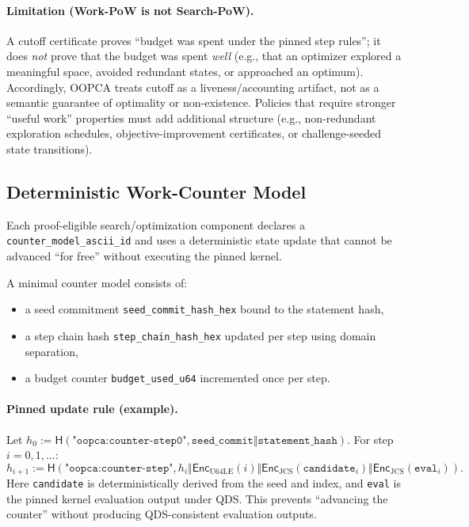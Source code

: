 \documentclass[11pt]{article}
\newcommand{\Hash}{\mathsf{H}}
\newcommand{\Enc}{\mathsf{Enc}}
\begin{document}
\paragraph{Limitation (Work-PoW is not Search-PoW).}
A cutoff certificate proves ``budget was spent under the pinned step rules''; it does \emph{not} prove that the budget was spent \emph{well} (e.g., that an optimizer explored a meaningful space, avoided redundant states, or approached an optimum).
Accordingly, OOPCA treats cutoff as a liveness/accounting artifact, not as a semantic guarantee of optimality or non-existence.
Policies that require stronger ``useful work'' properties must add additional structure (e.g., non-redundant exploration schedules, objective-improvement certificates, or challenge-seeded state transitions).

\subsection{Deterministic Work-Counter Model}\label{sec:countermodel}

Each proof-eligible search/optimization component declares a \texttt{counter\_model\_ascii\_id} and uses a deterministic state update that cannot be advanced ``for free'' without executing the pinned kernel.

A minimal counter model consists of:
\begin{itemize}[leftmargin=1.2em]
  \item a seed commitment \texttt{seed\_commit\_hash\_hex} bound to the statement hash,
  \item a step chain hash \texttt{step\_chain\_hash\_hex} updated per step using domain separation,
  \item a budget counter \texttt{budget\_used\_u64} incremented once per step.
\end{itemize}

\paragraph{Pinned update rule (example).}
Let $h_0 := \Hash(\texttt{"oopca:counter-step0"}, \texttt{seed\_commit} \Vert \texttt{statement\_hash})$. For step $i=0,1,\ldots$:
\[
h_{i+1} := \Hash(\texttt{"oopca:counter-step"}, h_i \Vert \Enc_{\text{U64LE}}(i) \Vert \Enc_{\text{JCS}}(\texttt{candidate}_i) \Vert \Enc_{\text{JCS}}(\texttt{eval}_i)).
\]
Here \texttt{candidate} is deterministically derived from the seed and index, and \texttt{eval} is the pinned kernel evaluation output under QDS. This prevents ``advancing the counter'' without producing QDS-consistent evaluation outputs.
\end{document}
